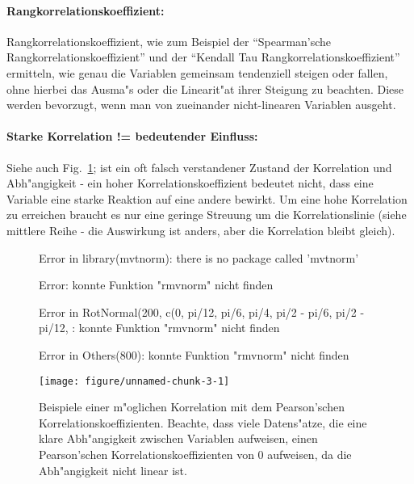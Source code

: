 \documentclass[a4paper,twoside]{tufte-book}\usepackage[]{graphicx}\usepackage[]{color}
\makeatletter
\def\maxwidth{ %
  \ifdim\Gin@nat@width>\linewidth
    \linewidth
  \else
    \Gin@nat@width
  \fi
}
\makeatother
\begin{document}
\paragraph{Rangkorrelationskoeffizient:} Rangkorrelationskoeffizient, wie zum Beispiel der "`Spearman'sche Rangkorrelationskoeffizient"' und der "`Kendall Tau Rangkorrelationskoeffizient"' ermitteln, wie genau die Variablen gemeinsam tendenziell steigen oder fallen, ohne hierbei das Ausma"s oder die Linearit"at ihrer Steigung zu beachten. Diese werden bevorzugt, wenn man von zueinander nicht-linearen Variablen ausgeht. 

\paragraph{Starke Korrelation != bedeutender Einfluss:} Siehe auch Fig.~\ref{fig: correlation}; ist ein oft falsch verstandener Zustand der Korrelation und Abh"angigkeit - ein hoher Korrelationskoeffizient bedeutet nicht, dass eine Variable eine starke Reaktion auf eine andere bewirkt. Um eine hohe Korrelation zu erreichen braucht es nur eine geringe Streuung um die Korrelationslinie (siehe mittlere Reihe - die Auswirkung ist anders, aber die Korrelation bleibt gleich). 


\begin{figure}[htbp]
\begin{center}
\begin{Schunk}
\begin{Soutput}
Error in library(mvtnorm): there is no package called 'mvtnorm'
\end{Soutput}
\begin{Soutput}
Error: konnte Funktion "rmvnorm" nicht finden
\end{Soutput}
\begin{Soutput}
Error in RotNormal(200, c(0, pi/12, pi/6, pi/4, pi/2 - pi/6, pi/2 - pi/12, : konnte Funktion "rmvnorm" nicht finden
\end{Soutput}
\begin{Soutput}
Error in Others(800): konnte Funktion "rmvnorm" nicht finden
\end{Soutput}

\texttt{[image: figure/unnamed-chunk-3-1]} \end{Schunk}
\caption{Beispiele einer m"oglichen Korrelation mit dem Pearson'schen Korrelationskoeffizienten. Beachte, dass viele Datens"atze, die eine klare Abh"angigkeit zwischen Variablen aufweisen, einen Pearson'schen Korrelationskoeffizienten von 0 aufweisen, da die Abh"angigkeit nicht linear ist.}
\label{fig: correlation}
\end{center}
\end{figure}
\end{document}
